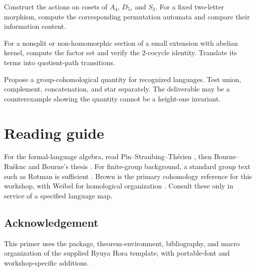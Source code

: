 \documentclass{amsart}
\begin{document}
\begin{exercise}
Construct the actions on cosets of $A_4$, $D_5$, and $S_3$.  For a fixed two-letter morphism, compute the corresponding permutation automata and compare their information content.
\end{exercise}

\begin{exercise}
For a nonsplit or non-homomorphic section of a small extension with abelian kernel, compute the factor set and verify the $2$-cocycle identity.  Translate its terms into quotient-path transitions.
\end{exercise}

\begin{exercise}
Propose a group-cohomological quantity for recognized languages.  Test union, complement, concatenation, and star separately.  The deliverable may be a counterexample showing the quantity cannot be a height-one invariant.
\end{exercise}

\section{Reading guide}

For the formal-language algebra, read Pin--Straubing--Th\'erien \cite{pinStraubingTherien1992}, then Bourne--Ru\v{s}kuc and Bourne's thesis \cite{bourneRuskuc2016,bourne2017counting}.  For finite-group background, a standard group text such as Rotman is sufficient \cite{rotman1995introduction}.  Brown is the primary cohomology reference for this workshop, with Weibel for homological organization \cite{brown1982cohomology,weibel1994homological}.  Consult these only in service of a specified language map.

\subsection*{Acknowledgement}

This primer uses the package, theorem-environment, bibliography, and macro organization of the supplied Ryuya Hora  template, with portable-font and workshop-specific additions.

\printbibliography
\end{document}
